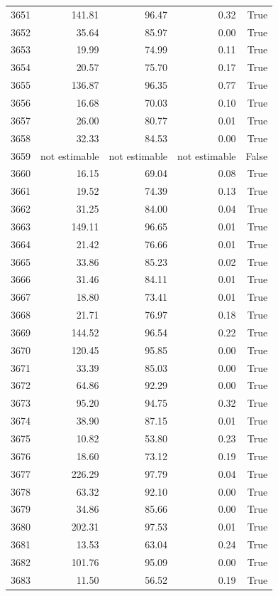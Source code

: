 \begin{longtable}{rrrrr}
3651 & 141.81 & 96.47 & 0.32 & True \\
3652 & 35.64 & 85.97 & 0.00 & True \\
3653 & 19.99 & 74.99 & 0.11 & True \\
3654 & 20.57 & 75.70 & 0.17 & True \\
3655 & 136.87 & 96.35 & 0.77 & True \\
3656 & 16.68 & 70.03 & 0.10 & True \\
3657 & 26.00 & 80.77 & 0.01 & True \\
3658 & 32.33 & 84.53 & 0.00 & True \\
3659 & not estimable & not estimable & not estimable & False \\
3660 & 16.15 & 69.04 & 0.08 & True \\
3661 & 19.52 & 74.39 & 0.13 & True \\
3662 & 31.25 & 84.00 & 0.04 & True \\
3663 & 149.11 & 96.65 & 0.01 & True \\
3664 & 21.42 & 76.66 & 0.01 & True \\
3665 & 33.86 & 85.23 & 0.02 & True \\
3666 & 31.46 & 84.11 & 0.01 & True \\
3667 & 18.80 & 73.41 & 0.01 & True \\
3668 & 21.71 & 76.97 & 0.18 & True \\
3669 & 144.52 & 96.54 & 0.22 & True \\
3670 & 120.45 & 95.85 & 0.00 & True \\
3671 & 33.39 & 85.03 & 0.00 & True \\
3672 & 64.86 & 92.29 & 0.00 & True \\
3673 & 95.20 & 94.75 & 0.32 & True \\
3674 & 38.90 & 87.15 & 0.01 & True \\
3675 & 10.82 & 53.80 & 0.23 & True \\
3676 & 18.60 & 73.12 & 0.19 & True \\
3677 & 226.29 & 97.79 & 0.04 & True \\
3678 & 63.32 & 92.10 & 0.00 & True \\
3679 & 34.86 & 85.66 & 0.00 & True \\
3680 & 202.31 & 97.53 & 0.01 & True \\
3681 & 13.53 & 63.04 & 0.24 & True \\
3682 & 101.76 & 95.09 & 0.00 & True \\
3683 & 11.50 & 56.52 & 0.19 & True \\

\end{longtable}
